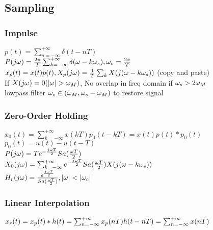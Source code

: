 \subsection{Sampling}
\subsubsection*{Impulse}
$p(t)=\sum_{n=-\infty}^{+\infty} \delta(t-nT)$\\
$P(j\omega)=\frac{2\pi}{T}\sum_{k=-\infty}^{+\infty} \delta(\omega-k\omega_s), \omega_s=\frac{2\pi}{T}$\\
$x_p(t)=x(t)p(t), X_p(j\omega) = \frac{1}{T}\sum_k X(j(\omega-k\omega_s))$ (copy and paste)\\
If $X(j\om)=0(|\om|>\om_M)$, No overlap in freq domain if $\omega_s>2\omega_M$\\
lowpass filter $\omega_c\in(\omega_M,\omega_s - \omega_M)$ to restore signal
\subsubsection*{Zero-Order Holding}
$x_0(t)=\sum_{k=-\infty}^{+\infty} x(kT)p_0(t-kT)=x(t)p(t)*p_0(t)$\\
$ p_0(t)=u(t)-u(t-T)$\\
$P(j\omega)=Te^{-\frac{j\omega T}{2}} Sa(\frac{\omega T}{2})$\\
$X_0(j\omega)=\sum_{k=-\infty}^{+\infty} e^{-\frac{j\omega T}{2}} Sa(\frac{\omega T}{2}) X(j(\omega-k\omega_s))$\\
$H_{r}(j\om) =\frac{e^{\frac{j\om T}2}}{Sa(\frac{\om T}{2})}, |\om|<|\om_c|$\\
\subsubsection*{Linear Interpolation}
$x_r(t)=x_p(t)*h(t)=\sum_{n=-\infty}^{+\infty} x_p(nT) h(t-nT)\\=\sum_{n=-\infty}^{+\infty} x(nT) $